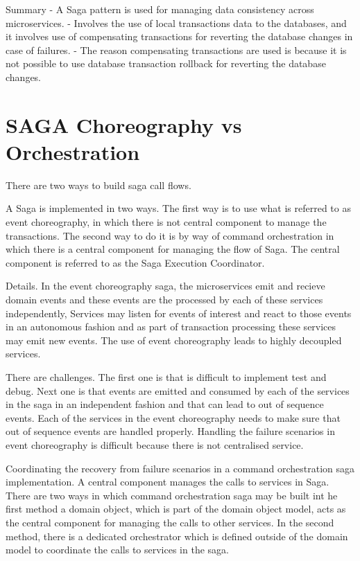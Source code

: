 Summary
- A Saga pattern is used for managing data consistency across microservices.
- Involves the use of local transactions data to the databases, and it involves use of compensating transactions for reverting the database changes in case of failures.
- The reason compensating transactions are used is because it is not possible to use database transaction rollback for reverting the database changes.

\section{SAGA Choreography vs Orchestration}

There are two ways to build saga call flows.

A Saga is implemented in two ways.
The first way is to use what is referred to as event choreography, in which there is not central component to manage the transactions.
The second way to do it is by way of command orchestration in which there is a central component for managing the flow of Saga.
The central component is referred to as the Saga Execution Coordinator.

Details.
In the event choreography saga, the microservices emit and recieve domain events and these events are the processed by each of these services independently,
Services may listen for events of interest and react to those events in an autonomous fashion and as part of transaction processing these services may emit new events.
The use of event choreography leads to highly decoupled services.

There are challenges.
The first one is that is difficult to implement test and debug.
Next one is that events are emitted and consumed by each of the services in the saga in an independent fashion and that can lead to out of sequence events.
Each of the services in the event choreography needs to make sure that out of sequence events are handled properly.
Handling the failure scenarios in event choreography is difficult because there is not centralised service.

Coordinating the recovery from failure scenarios in a command orchestration saga implementation.
A central component manages the calls to services in Saga.
There are two ways in which command orchestration saga may be built int he first method a domain object, which is part of the domain object model, acts as the central component for managing the calls to other services.
In the second method, there is a dedicated orchestrator which is defined outside of the domain model to coordinate the calls to services in the saga.

